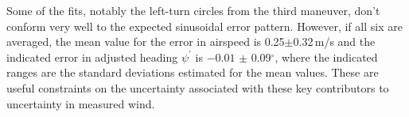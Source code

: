 \documentclass[12pt,twoside,english]{article}\usepackage[]{graphicx}\usepackage[]{color}
\providecommand{\tabularnewline}{\\}
\begin{document}
Some of the fits, notably the left-turn circles from the third maneuver, don't conform very well to the expected sinusoidal error pattern. 
However, if all six are averaged, the mean value for the error in airspeed is 
0.25$\pm$0.32\,m/s and the indicated error in adjusted heading $\psi^{\prime}$ is  
\ensuremath{-0.01} $\pm$ 0.09$^{\circ}$, where the indicated ranges are the standard deviations estimated for the mean values. These are useful constraints on the uncertainty associated with these key contributors to uncertainty in measured wind. 





% 
% 
% 
\end{document}

